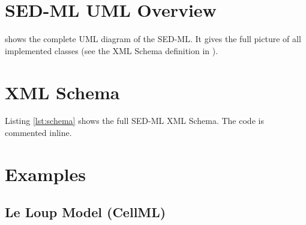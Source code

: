 \documentclass[11pt]{article}
\begin{document}
\begin{appendix}

\section{SED-ML UML Overview}
\label{app:uml}
 shows the complete UML diagram of the SED-ML. It gives the full picture of all implemented classes (see the XML Schema definition in \pageref{lst:schema}).
%
  

\section{XML Schema}
\label{sec:xmlschema}
Listing \ref{lst:schema} shows the full SED-ML XML Schema. The code is commented inline.



\section{Examples}

\subsection{Le Loup Model (CellML)}


\end{appendix}



\end{document}

